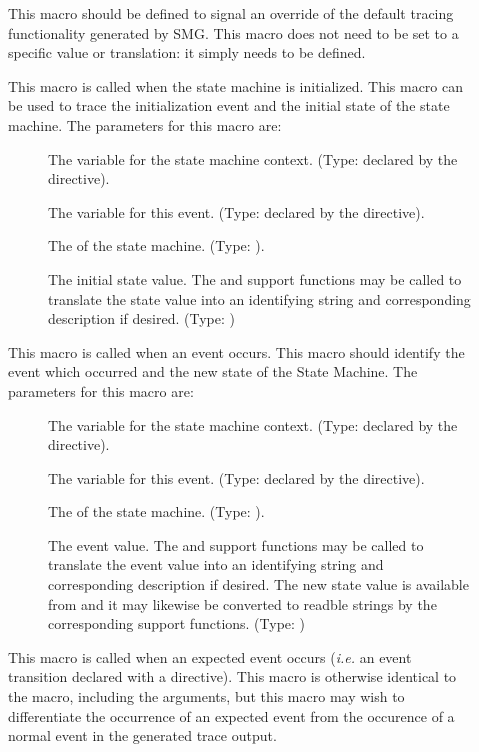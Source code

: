\begin{description}
\item[] This macro should be defined to signal an
  override of the default tracing functionality generated by SMG.
  This macro does not need to be set to a specific value or
  translation: it simply needs to be defined.
\item[] This macro is called when the state
  machine is initialized.  This macro can be used to trace the
  initialization event and the initial state of the state machine.
  The parameters for this macro are:
  \begin{description}
  \item[] The  variable for the state machine
    context.  (Type: declared by the \SMOBJ directive).
  \item[] The  variable for this event.  (Type:
    declared by the \SMEVT directive).
  \item[] The \SMNAME of the state machine.  (Type:
    ).
  \item[] The initial state value.  The
     and  support
    functions may be called to translate the state value into an
    identifying string and corresponding description if desired.
    (Type: )
  \end{description}
\item[] This macro is called when an event
  occurs.  This macro should identify the event which occurred and the
  new state of the State Machine.  The parameters for this macro are:
  \begin{description}
  \item[] The  variable for the state machine
    context.  (Type: declared by the \SMOBJ directive).
  \item[] The  variable for this event.  (Type:
    declared by the \SMEVT directive).
  \item[] The \SMNAME of the state machine.  (Type:
    ).
  \item[] The event value.  The 
    and  support functions may be called to
    translate the event value into an identifying string and
    corresponding description if desired.  The new state value is
    available from  and it may likewise be
    converted to readble strings by the corresponding support
    functions.  (Type: )
  \end{description}
\item[] This macro is called when an expected
  event occurs ({\it i.e.} an event transition declared with a
  \TRANSeq directive).  This macro is otherwise identical to the
   macro, including the arguments, but this macro
  may wish to differentiate the occurrence of an expected event from
  the occurence of a normal event in the generated trace output.
\end{description}


